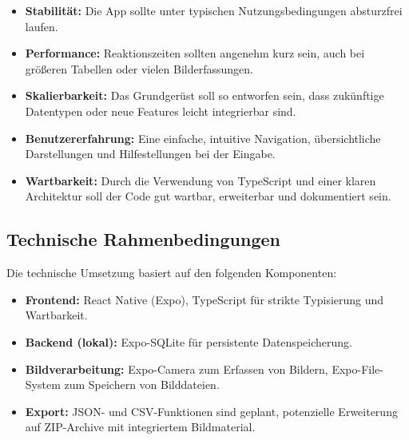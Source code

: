 \documentclass[a4paper,12pt]{article}
\begin{document}
\begin{itemize}[leftmargin=1.5cm]
    \item \textbf{Stabilität:} Die App sollte unter typischen Nutzungsbedingungen absturzfrei laufen.
    \item \textbf{Performance:} Reaktionszeiten sollten angenehm kurz sein, auch bei größeren Tabellen oder vielen Bilderfassungen.
    \item \textbf{Skalierbarkeit:} Das Grundgerüst soll so entworfen sein, dass zukünftige Datentypen oder neue Features leicht integrierbar sind.
    \item \textbf{Benutzererfahrung:} Eine einfache, intuitive Navigation, übersichtliche Darstellungen und Hilfestellungen bei der Eingabe.
    \item \textbf{Wartbarkeit:} Durch die Verwendung von TypeScript und einer klaren Architektur soll der Code gut wartbar, erweiterbar und dokumentiert sein.
\end{itemize}

\subsection{Technische Rahmenbedingungen}
Die technische Umsetzung basiert auf den folgenden Komponenten:
\begin{itemize}[leftmargin=1.5cm]
    \item \textbf{Frontend:} React Native (Expo), TypeScript für strikte Typisierung und Wartbarkeit.
    \item \textbf{Backend (lokal):} Expo-SQLite für persistente Datenspeicherung.
    \item \textbf{Bildverarbeitung:} Expo-Camera zum Erfassen von Bildern, Expo-File-System zum Speichern von Bilddateien.
    \item \textbf{Export:} JSON- und CSV-Funktionen sind geplant, potenzielle Erweiterung auf ZIP-Archive mit integriertem Bildmaterial.
\end{itemize}
\end{document}
